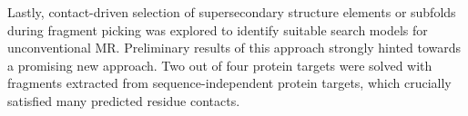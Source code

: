 Lastly, contact-driven selection of supersecondary structure elements or subfolds during fragment picking was explored to identify suitable search models for unconventional MR. Preliminary results of this approach strongly hinted towards a promising new approach. Two out of four protein targets were solved with fragments extracted from sequence-independent protein targets, which crucially satisfied many predicted residue contacts.

\clearpage
\onehalfspacing
